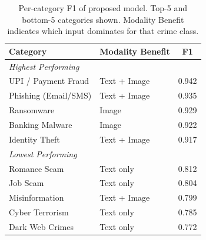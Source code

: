 \begin{table}[htbp]
\caption{Per-category F1 of proposed model.
         Top-5 and bottom-5 categories shown.
         Modality Benefit indicates which input
         dominates for that crime class.}
\centering
\small
\setlength{\tabcolsep}{4pt}
\renewcommand{\arraystretch}{1.15}
\begin{tabular}{llc}
\toprule
\rowcolor{headerblue}
\textbf{Category} & \textbf{Modality Benefit} & \textbf{F1} \\
\midrule
\multicolumn{3}{l}{\textit{Highest Performing}} \\
\midrule
UPI / Payment Fraud      & Text + Image & 0.942 \\
Phishing (Email/SMS)     & Text + Image & 0.935 \\
Ransomware               & Image        & 0.929 \\
Banking Malware          & Image        & 0.922 \\
Identity Theft           & Text + Image & 0.917 \\
\midrule
\multicolumn{3}{l}{\textit{Lowest Performing}} \\
\midrule
Romance Scam             & Text only    & 0.812 \\
Job Scam                 & Text only    & 0.804 \\
Misinformation           & Text + Image & 0.799 \\
Cyber Terrorism          & Text only    & 0.785 \\
Dark Web Crimes          & Text only    & 0.772 \\
\bottomrule
\end{tabular}
\label{tab:percategory}
\end{table}

